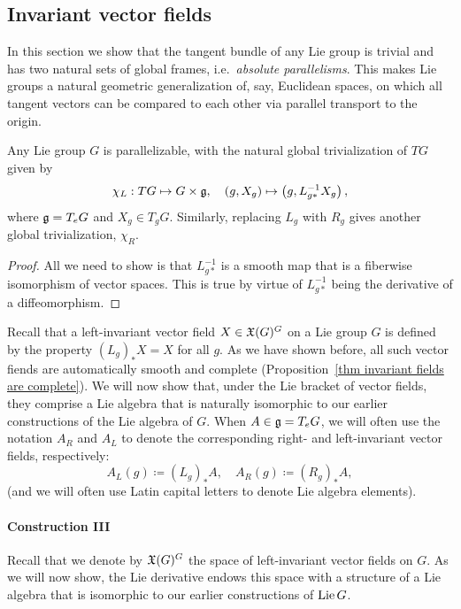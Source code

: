 \subsection{Invariant vector fields}

In this section we show that the tangent bundle of any Lie group is trivial and has two natural sets of global frames, i.e.\ \emph{absolute parallelisms}. This makes Lie groups a natural geometric generalization of, say, Euclidean spaces, on which all tangent vectors can be compared to each other via parallel transport to the origin.

\begin{prop}
    Any Lie group $G$ is parallelizable, with the natural global trivialization of $TG$ given by
    \[\chi_L:TG\mapsto G\times \mathfrak{g},\quad (g,X_g)\mapsto \left(g, L_{g\ast }^{-1}X_g\right),\]
    where $\mathfrak{g}=T_e G$ and $X_g\in T_gG$. Similarly, replacing $L_g$ with $R_g$ gives another global trivialization, $\chi_R$.
\end{prop}
\begin{proof}
    All we need to show is that $L_{g\ast}^{-1}$ is a smooth map that is a fiberwise isomorphism of vector spaces. This is true by virtue of $L_{g\ast}^{-1}$ being the derivative of a diffeomorphism.
\end{proof}

Recall that a left-invariant vector field $X\in\mathfrak{X}(G)^G$ on a Lie group $G$ is defined by the property $(L_g)_\ast X=X$ for all $g$. As we have shown before, all such vector fiends are automatically smooth and complete (Proposition~\ref{thm invariant fields are complete}). We will now show that, under the Lie bracket of vector fields, they comprise a Lie algebra that is naturally isomorphic to our earlier constructions of the Lie algebra of $G$. When $A\in\mathfrak{g}=T_eG$, we will often use the notation $A_R$ and $A_L$ to denote the corresponding right- and left-invariant vector fields, respectively:
\[A_L(g)\coloneqq (L_g)_\ast A,\quad A_R(g)\coloneqq (R_g)_\ast A,\]
(and we will often use Latin capital letters to denote Lie algebra elements).

\paragraph{Construction III} Recall that we denote by $\mathfrak{X}(G)^G$ the space of left-invariant vector fields on $G$. As we will now show, the Lie derivative endows this space with a structure of a Lie algebra that is isomorphic to our earlier constructions of $\operatorname{Lie} G$.

